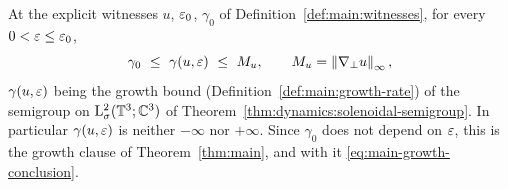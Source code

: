 \begin{theorem}
  \label{thm:main-growth-rate}
  \leanok
  At the explicit witnesses $u$, $\varepsilon_0$, $\gamma_0$ of
  Definition~\ref{def:main:witnesses}, for every $0<\varepsilon\leq\varepsilon_0$,
  \[
    \gamma_0\ \leq\ \gamma(u,\varepsilon)\ \leq\ M_u,
    \qquad
    M_u=\left\|\nabla_\perp u\right\|_\infty,
  \]
  $\gamma(u,\varepsilon)$ being the growth bound (Definition~\ref{def:main:growth-rate})
  of the semigroup on $\mathrm{L}^2_\sigma(\mathbb{T}^3;\mathbb{C}^3)$ of
  Theorem~\ref{thm:dynamics:solenoidal-semigroup}.  In particular
  $\gamma(u,\varepsilon)$ is neither $-\infty$ nor $+\infty$.  Since $\gamma_0$ does not
  depend on $\varepsilon$, this is the growth clause of Theorem~\ref{thm:main}, and with it
  \eqref{eq:main-growth-conclusion}.
\end{theorem}

